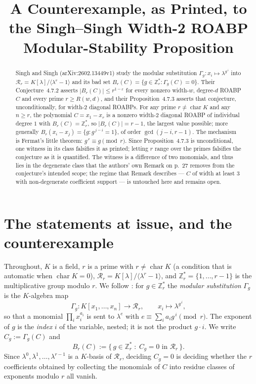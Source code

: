 \documentclass[11pt]{amsart}
\title[A counterexample, as printed, to a modular-stability proposition]
{A Counterexample, as Printed, to the Singh--Singh Width-2 ROABP Modular-Stability Proposition}
\date{}
\theoremstyle{definition}
\theoremstyle{remark}
\newcommand{\KK}{K}
\newcommand{\Rr}{\mathcal{R}_r}
\newcommand{\Zrs}{\mathbb{Z}_r^{*}}
\newcommand{\Bad}{B_r}
\newcommand{\Gam}{\Gamma}
\begin{document}
\begin{abstract}
Singh and Singh (arXiv:2602.13449v1) study the modular substitution
$\Gam_g\colon x_i\mapsto\lambda^{g^{\,i}}$ into
$\Rr=\KK[\lambda]/\langle\lambda^r-1\rangle$ and its bad set
$\Bad(C)=\{g\in\Zrs: \Gam_g(C)=0\}$. Their Conjecture~4.7.2 asserts
$|\Bad(C)|\le r^{1-\varepsilon}$ for every nonzero width-$w$, degree-$d$ ROABP $C$ and every
prime $r\ge R(w,d)$, and their Proposition~4.7.3 asserts that conjecture, unconditionally, for
width-$2$ diagonal ROABPs.
For any prime $r\ne\operatorname{char}\KK$ and any $n\ge r$, the polynomial
$C=x_1-x_r$ is a nonzero width-$2$ diagonal ROABP of individual degree $1$ with
$\Bad(C)=\Zrs$, so $|\Bad(C)|=r-1$, the largest value possible; more generally
$\Bad(x_i-x_j)=\{g:g^{\,j-i}=1\}$, of order $\gcd(j-i,r-1)$. The mechanism is Fermat's little
theorem: $g^{\,r}\equiv g \pmod r$. Since Proposition~4.7.3 is unconditional, one witness in its
class falsifies it as printed; letting $r$ range over the primes falsifies the conjecture as it is
quantified.
The witness is a difference of two monomials, and thus lies in the degenerate class that the
authors' own Remark on p.~27 removes from the conjecture's intended scope; the regime that Remark
describes --- $C$ of width at least $3$ with non-degenerate coefficient support --- is untouched
here and remains open.
\end{abstract}

\maketitle

\section{The statements at issue, and the counterexample}

Throughout, $\KK$ is a field, $r$ is a prime with $r\ne\operatorname{char}\KK$ (a condition that is
automatic when $\operatorname{char}\KK=0$), $\Rr=\KK[\lambda]/\langle\lambda^r-1\rangle$, and $\Zrs=\{1,\dots,r-1\}$ is the multiplicative
group modulo $r$. We follow \cite[Definition~4.7.1, printed p.~26]{SS}: for $g\in\Zrs$ the
\emph{modular substitution} $\Gam_g$ is the $\KK$-algebra map
\[
 \Gam_g\colon \KK[x_1,\dots,x_n]\longrightarrow\Rr,
 \qquad
 x_i\longmapsto \lambda^{g^{\,i}} ,
\]
so that a monomial $\prod_i x_i^{a_i}$ is sent to $\lambda^{e}$ with
$e\equiv\sum_i a_i g^{\,i}\pmod r$. The exponent of $g$ is the \emph{index} $i$ of the variable,
nested; it is not the product $g\cdot i$. We write $C_g:=\Gam_g(C)$ and
\[
 \Bad(C):=\bigl\{\,g\in\Zrs \;:\; C_g=0 \text{ in }\Rr\,\bigr\}.
\]
Since $\lambda^0,\lambda^1,\dots,\lambda^{r-1}$ is a $\KK$-basis of $\Rr$, deciding $C_g=0$ is
deciding whether the $r$ coefficients obtained by collecting the monomials of $C$ into residue
classes of exponents modulo $r$ all vanish.
\end{document}
